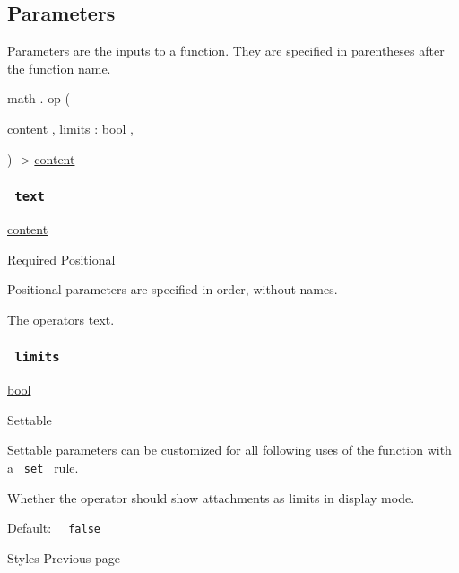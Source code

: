 \subsection{\texorpdfstring{{ Parameters
}}{ Parameters }}\label{parameters}

\label{parameters-tooltip}
Parameters are the inputs to a function. They are specified in
parentheses after the function name.

math { . } { op } (

{ \href{/docs/reference/foundations/content/}{content} , } {
\hyperref[parameters-limits]{limits :}
\href{/docs/reference/foundations/bool/}{bool} , }

) -\textgreater{} \href{/docs/reference/foundations/content/}{content}

\subsubsection{\texorpdfstring{\texttt{\ text\ }}{ text }}\label{parameters-text}

\href{/docs/reference/foundations/content/}{content}

{Required} {{ Positional }}

\label{parameters-text-positional-tooltip}
Positional parameters are specified in order, without names.

The operator\textquotesingle s text.

\subsubsection{\texorpdfstring{\texttt{\ limits\ }}{ limits }}\label{parameters-limits}

\href{/docs/reference/foundations/bool/}{bool}

{{ Settable }}

\label{parameters-limits-settable-tooltip}
Settable parameters can be customized for all following uses of the
function with a \texttt{\ set\ } rule.

Whether the operator should show attachments as limits in display mode.

Default: \texttt{\ }{\texttt{\ false\ }}\texttt{\ }

\href{/docs/reference/math/styles/}{\pandocbounded{}}

{ Styles } { Previous page }

\href{/docs/reference/math/underover/}{\pandocbounded{}}

